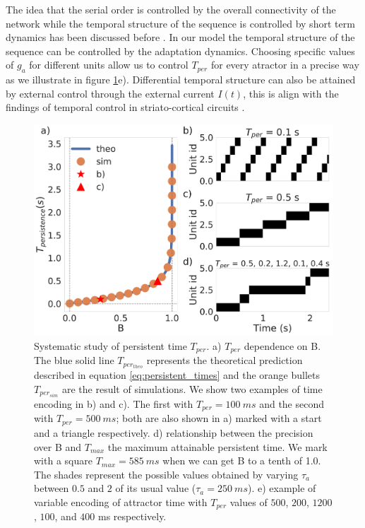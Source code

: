 \documentclass[10pt,a4paper]{article}
\begin{document}
The idea that the serial order is controlled by the overall connectivity of the network while the temporal structure of the sequence is controlled by short term dynamics has been discussed before \cite{veliz2015networks}. In our model the temporal structure of the sequence can be controlled  by the adaptation dynamics. Choosing specific values of $g_a$ for different units allow us to control $T_{per}$ for every atractor in a precise way as we illustrate in figure \ref{fig:per_time}e). Differential temporal structure can also be attained by external control through the external current $I(t)$, this is align with the findings of temporal control in striato-cortical circuits \cite{murray2017learning}. 


\begin{figure}[H]
\centering
\includegraphics[scale=0.30]{persistent_times.pdf}
\caption{Systematic study of persistent time $T_{per}$. a) $T_{per}$ dependence on B. The blue solid line $T_{per_{theo}}$ represents the theoretical prediction described in equation \ref{eq:persistent_times} and the orange bullets $T_{per_{sim}}$ are the result of simulations. We show two examples of time encoding in b) and c). The first with $T_{per}=100 \: ms$ and the second with $T_{per}=500 \: ms$; both are also shown in a) marked with a start and a triangle respectively. d) relationship between the precision over B and $T_{max}$ the maximum attainable persistent time. We mark with a square $T_{max}=585 \:ms$  when we can get B to a tenth of 1.0. The shades represent the possible values obtained by varying $\tau_a$ between $0.5$ and $2$ of its usual value ($\tau_a = 250 \: ms$). e) example of variable encoding of attractor time with $T_{per}$ values of $500$, $200$, $1200$, $100$, and $400 $ ms respectively.}
\label{fig:per_time}
\end{figure}
\end{document}
